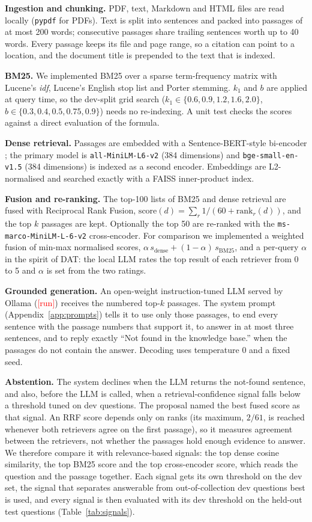\documentclass[11pt]{article}
\newcommand{\pending}{\textcolor{red}{[run]}}
\providecommand{\GeneratorModel}{\pending}\providecommand{\JudgeModel}{\pending}
\begin{document}
\textbf{Ingestion and chunking.} PDF, text, Markdown and HTML files are read locally
(\texttt{pypdf} for PDFs). Text is split into sentences and packed into passages of at most
200 words; consecutive passages share trailing sentences worth up to 40 words. Every passage
keeps its file and page range, so a citation can point to a location, and the document title
is prepended to the text that is indexed.

\textbf{BM25.} We implemented BM25 over a sparse term-frequency matrix with Lucene's
\emph{idf}, Lucene's English stop list and Porter stemming. $k_1$ and $b$ are applied at
query time, so the dev-split grid search ($k_1\in\{0.6,0.9,1.2,1.6,2.0\}$,
$b\in\{0.3,0.4,0.5,0.75,0.9\}$) needs no re-indexing. A unit test checks the scores against
a direct evaluation of the formula.

\textbf{Dense retrieval.} Passages are embedded with a Sentence-BERT-style bi-encoder
\citep{reimers2019sbert}; the primary model is \texttt{all-MiniLM-L6-v2} (384 dimensions) and
\texttt{bge-small-en-v1.5} (384 dimensions) is indexed as a second encoder. Embeddings are
L2-normalised and searched exactly with a FAISS inner-product index.

\textbf{Fusion and re-ranking.} The top-100 lists of BM25 and dense retrieval are fused with
Reciprocal Rank Fusion, $\mathrm{score}(d)=\sum_r 1/(60+\mathrm{rank}_r(d))$, and the top $k$
passages are kept. Optionally the top 50 are re-ranked with the
\texttt{ms-marco-MiniLM-L-6-v2} cross-encoder. For comparison we implemented a weighted
fusion of min-max normalised scores, $\alpha\, s_{\text{dense}}+(1-\alpha)\, s_{\text{BM25}}$,
and a per-query $\alpha$ in the spirit of DAT: the local LLM rates the top result of each
retriever from 0 to 5 and $\alpha$ is set from the two ratings.

\textbf{Grounded generation.} An open-weight instruction-tuned LLM served by Ollama
(\GeneratorModel) receives the numbered top-$k$ passages. The system prompt
(Appendix~\ref{app:prompts}) tells it to use only those passages, to end every sentence with
the passage numbers that support it, to answer in at most three sentences, and to reply
exactly ``Not found in the knowledge base.'' when the passages do not contain the answer.
Decoding uses temperature 0 and a fixed seed.

\textbf{Abstention.} The system declines when the LLM returns the not-found sentence, and
also, before the LLM is called, when a retrieval-confidence signal falls below a threshold
tuned on dev questions. The proposal named the best fused score as that signal. An RRF score
depends only on ranks (its maximum, $2/61$, is reached whenever both retrievers agree on the
first passage), so it measures agreement between the retrievers, not whether the passages
hold enough evidence to answer. We therefore compare it with relevance-based signals: the top
dense cosine similarity, the top BM25 score and the top cross-encoder score, which reads the
question and the passage together. Each signal gets its own threshold on the dev set, the
signal that separates answerable from out-of-collection dev questions best is used, and every
signal is then evaluated with its dev threshold on the held-out test questions
(Table~\ref{tab:signals}).
\end{document}
